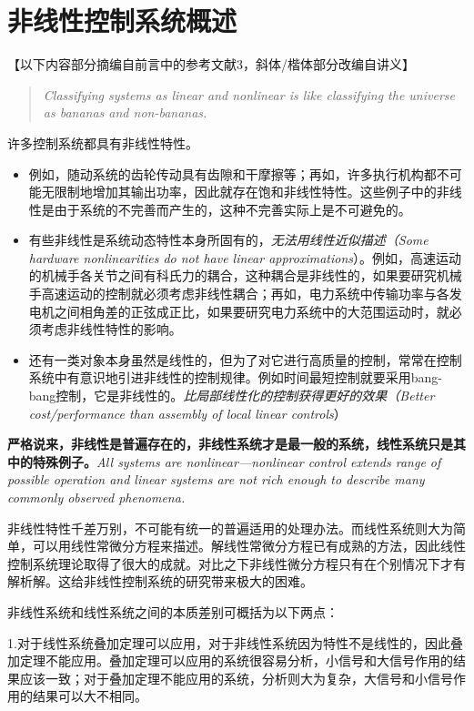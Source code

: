 \section{非线性控制系统概述}\label{1Aref}
【以下内容部分摘编自前言中的参考文献3，斜体/楷体部分改编自讲义】
\begin{quote}
  \textit{Classifying systems as linear and nonlinear is like classifying the universe as bananas and non-bananas.}
\end{quote}
许多控制系统都具有非线性特性。
\begin{itemize}[leftmargin=2em]
  \item 例如，随动系统的齿轮传动具有齿隙和干摩擦等；再如，许多执行机构都不可能无限制地增加其输出功率，因此就存在饱和非线性特性。这些例子中的非线性是由于系统的不完善而产生的，这种不完善实际上是不可避免的。
  \item 有些非线性是系统动态特性本身所固有的，{\it 无法用线性近似描述（Some hardware nonlinearities do not have linear approximations}）。例如，高速运动的机械手各关节之间有科氏力的耦合，这种耦合是非线性的，如果要研究机械手高速运动的控制就必须考虑非线性耦合；再如，电力系统中传输功率与各发电机之间相角差的正弦成正比，如果要研究电力系统中的大范围运动时，就必须考虑非线性特性的影响。
  \item 还有一类对象本身虽然是线性的，但为了对它进行高质量的控制，常常在控制系统中有意识地引进非线性的控制规律。例如时间最短控制就要采用bang-bang控制，它是非线性的。{\it 比局部线性化的控制获得更好的效果（Better cost/performance than assembly of local linear controls}）
\end{itemize}

{\bf 严格说来，非线性是普遍存在的，非线性系统才是最一般的系统，线性系统只是其中的特殊例子。}{\it All systems are nonlinear---nonlinear control extends range of
possible operation and linear systems are not rich enough to describe many
commonly observed phenomena.}

非线性特性千差万别，不可能有统一的普遍适用的处理办法。而线性系统则大为简单，可以用线性常微分方程来描述。解线性常微分方程已有成熟的方法，因此线性控制系统理论取得了很大的成就。对比之下非线性微分方程只有在个别情况下才有解析解。这给非线性控制系统的研究带来极大的困难。

非线性系统和线性系统之间的本质差别可概括为以下两点：

1.对于线性系统叠加定理可以应用，对于非线性系统因为特性不是线性的，因此叠加定理不能应用。叠加定理可以应用的系统很容易分析，小信号和大信号作用的结果应该一致；对于叠加定理不能应用的系统，分析则大为复杂，大信号和小信号作用的结果可以大不相同。

